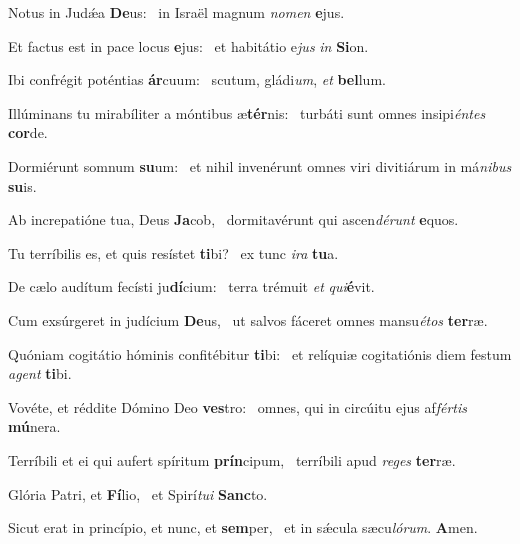 \item Notus in Judǽa \textbf{De}us:~\psstar{} in Israël magnum \textit{nomen} \textbf{e}jus.

\item Et factus est in pace locus \textbf{e}jus:~\psstar{} et habitátio e\textit{jus} \textit{in} \textbf{Si}on.

\item Ibi confrégit poténtias \textbf{ár}cuum:~\psstar{} scutum, gládi\textit{um}, \textit{et} \textbf{bel}lum.

\item Illúminans tu mirabíliter a móntibus æ\textbf{tér}nis:~\psstar{} turbáti sunt omnes insipi\textit{éntes} \textbf{cor}de.

\item Dormiérunt somnum \textbf{su}um:~\psstar{} et nihil invenérunt omnes viri divitiárum in má\textit{nibus} \textbf{su}is.

\item Ab increpatióne tua, Deus \textbf{Ja}cob,~\psstar{} dormitavérunt qui ascen\textit{dérunt} \textbf{e}quos.

\item Tu terríbilis es, et quis resístet \textbf{ti}bi?~\psstar{} ex tunc \textit{ira} \textbf{tu}a.

\item De cælo audítum fecísti ju\textbf{dí}cium:~\psstar{} terra trémuit \textit{et} \textit{qui}\textbf{é}vit.

\item Cum exsúrgeret in judícium \textbf{De}us,~\psstar{} ut salvos fáceret omnes mansu\textit{étos} \textbf{ter}ræ.

\item Quóniam cogitátio hóminis confitébitur \textbf{ti}bi:~\psstar{} et relíquiæ cogitatiónis diem festum \textit{agent} \textbf{ti}bi.

\item Vovéte, et réddite Dómino Deo \textbf{ves}tro:~\psstar{} omnes, qui in circúitu ejus af\textit{fértis} \textbf{mú}nera.

\item Terríbili et ei qui aufert spíritum \textbf{prín}cipum,~\psstar{} terríbili apud \textit{reges} \textbf{ter}ræ.

\item Glória Patri, et \textbf{Fí}lio,~\psstar{} et Spirí\textit{tui} \textbf{Sanc}to.

\item Sicut erat in princípio, et nunc, et \textbf{sem}per,~\psstar{} et in sǽcula sæcu\textit{lórum}. \textbf{A}men.
